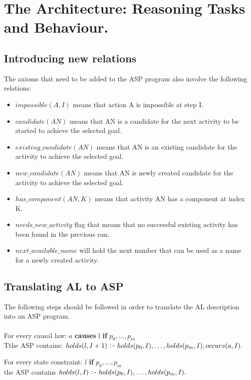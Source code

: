 \documentclass[11pt, oneside]{article}
\def\:-{\raisebox{.75pt}{\ :\,-\ }}
\begin{document}
\section{The Architecture: Reasoning Tasks and Behaviour.} 
\subsection{Introducing new relations}
The axioms that need to be added to the ASP program also involve the following relations:
\begin{itemize}
\item $impossible(A, I)$ means that action A is impossible at step I.
\item $candidate(AN)$ means that AN is a candidate for the next activity to be started to achieve the selected goal.
\item $existing\_candidate(AN)$ means that AN is an existing candidate for the activity to achieve the selected goal.
\item $new\_candidate(AN)$ means that AN is newly created candidate for the activity to achieve the selected goal.
\item $has\_component(AN, K)$ means that activity AN has a component at index K.
\item $needs\_new\_activity$ flag that means that no successful existing activity has been found in the previous run.
\item $next\_available\_name$ will hold the next number that can be used as a name for a newly created activity.
\end{itemize}



\subsection{Translating AL to ASP}
The following steps should be followed in order to translate the AL description into an ASP program.\\
\\
For every causal law: $a$ \textbf{causes} l \textbf{if} $p_0, \dots, p_m$\\
Tthe ASP contains: $holds(l, I+1) \:- holds(p_0, I), \dots, holds(p_m, I), occurs(a, I).$\par

For every state constraint: $l$ \textbf{if} $p_0, \dots, p_m$\\
the ASP contains $holds(l, I) \:- holds(p_0, I), \dots, holds(p_m, I).$\par
\end{document}

